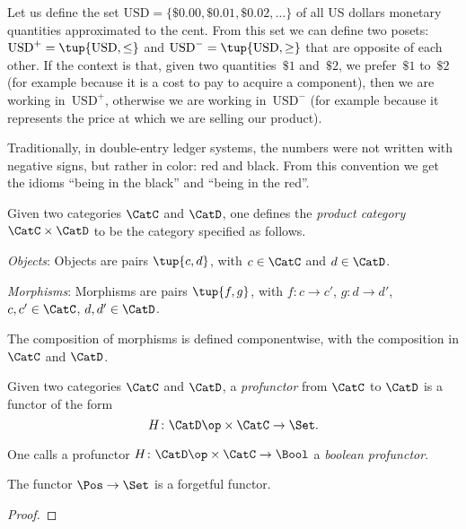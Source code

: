 
\begin{example}
   Let us define the set $\text{USD}=\{\$0.00,\$0.01,\$0.02,\dots\}$
   of all US dollars monetary quantities approximated to the cent.
   From this set we can define two posets:
       $\text{USD}^{+} = \tup{\text{USD}, \leq}$
       and $\text{USD}^{-} = \tup{\text{USD}, \geq}$
       that are opposite of each other.
   If the context is that, given two quantities~$\$1$ and~$\$2$,
   we prefer~$\$1$ to~$\$2$ (for example because it is a cost to pay to acquire a component), then we are working in~$\text{USD}^{+}$,
   otherwise we are working in~$\text{USD}^{-}$ (for example
   because it represents the price at which we are selling our product).

   Traditionally, in double-entry ledger systems, the numbers were not
   written with negative signs, but rather in color: red and black.
   From this convention we get the idioms ``being in the black''
   and ``being in the red''.
\end{example}

\begin{shaded}
\begin{definition}
Given two categories $\CatC$ and $\CatD$, one defines the \emph{product category} $\CatC \times \CatD$ to be the category specified as follows.
\begin{compactenum}
    \item \emph{Objects}: Objects are pairs $\tup{c,d}$, with $c\in \CatC$ and $d\in \CatD$.
    \item \emph{Morphisms}: Morphisms are pairs $\tup{f,g}$, with $f\colon c\to c'$, $g\colon d\to d'$, $c,c'\in \CatC$, $d,d'\in \CatD$.
    \item The composition of morphisms is defined componentwise, with the composition in $\CatC$ and $\CatD$. 
\end{compactenum}
\end{definition}

\begin{definition}[Profunctor]
Given two categories $\CatC$ and $\CatD$, a \emph{profunctor} from $\CatC$ to $\CatD$ is a functor of the form
\begin{equation}
    H\colon \CatD\op \times \CatC \to \Set.
\end{equation}
\end{definition}
\begin{remark}
One calls a profunctor $H\colon \CatD\op \times \CatC \to \Bool$ a \emph{boolean profunctor}.
\end{remark}
\end{shaded}

\begin{lemma}
The functor $\Pos \to \Set$ is a forgetful functor.
\end{lemma}
\begin{proof}
\end{proof}